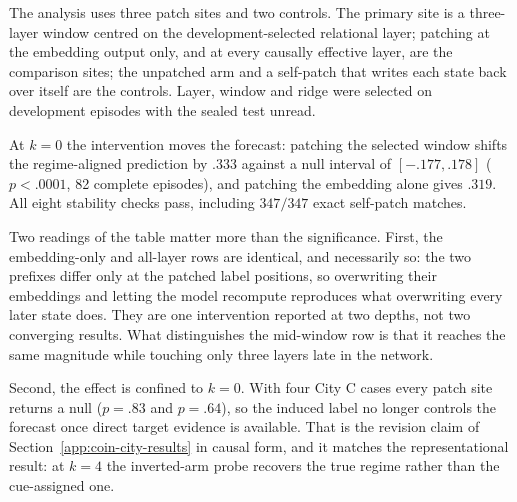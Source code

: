 The analysis uses three patch sites and two controls. The primary site is a
three-layer window centred on the development-selected relational layer;
patching at the embedding output only, and at every causally effective layer, are
the comparison sites; the unpatched arm and a self-patch that writes each state
back over itself are the controls. Layer, window and ridge were selected on
development episodes with the sealed test unread.

\begin{center}
\begin{minipage}{\linewidth}
\centering
{}
\label{tab:coin-city-causal-patch}
\small
\setlength{\tabcolsep}{4pt}
\resizebox{\linewidth}{!}{}
\end{minipage}
\end{center}

At $k=0$ the intervention moves the forecast: patching the selected window shifts
the regime-aligned prediction by $.333$ against a null interval of
$[-.177,.178]$ ($p<.0001$, 82 complete episodes), and patching the embedding
alone gives $.319$. All eight stability checks pass, including $347/347$ exact
self-patch matches.

Two readings of the table matter more than the significance. First, the
embedding-only and all-layer rows are identical, and necessarily so: the two
prefixes differ only at the patched label positions, so overwriting their embeddings
and letting the model recompute reproduces what overwriting every later state does. They are one intervention reported at two depths, not two
converging results. What distinguishes the mid-window row is that it reaches the
same magnitude while touching only three layers late in the network.

Second, the effect is confined to $k=0$. With four City C cases every patch site
returns a null ($p=.83$ and $p=.64$), so the induced label no longer controls the
forecast once direct target evidence is available. That is the revision claim of
Section~\ref{app:coin-city-results} in causal form, and it matches the
representational result: at $k=4$ the inverted-arm probe recovers the true regime
rather than the cue-assigned one.

